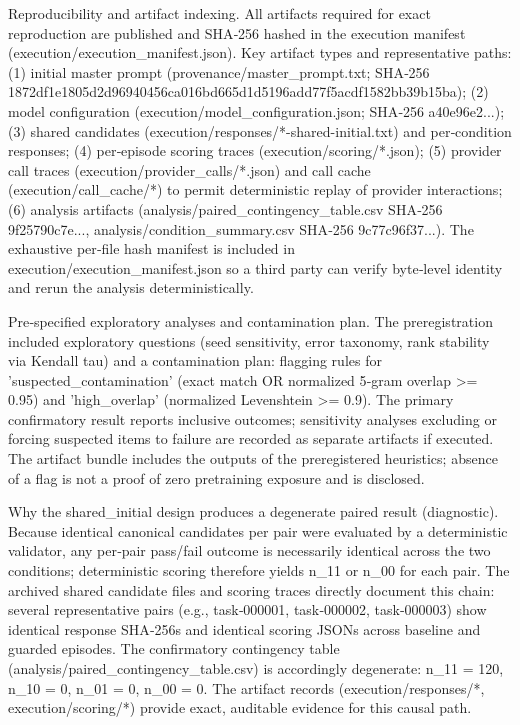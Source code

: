 \documentclass[conference]{IEEEtran}
\begin{document}
Reproducibility and artifact indexing. All artifacts required for exact reproduction are published and SHA‑256 hashed in the execution manifest (execution/execution\_manifest.json). Key artifact types and representative paths: (1) initial master prompt (provenance/master\_prompt.txt; SHA‑256 1872df1e1805d2d96940456ca016bd665d1d5196add77f5acdf1582bb39b15ba); (2) model configuration (execution/model\_configuration.json; SHA‑256 a40e96e2...); (3) shared candidates (execution/responses/*-shared-initial.txt) and per‑condition responses; (4) per‑episode scoring traces (execution/scoring/*.json); (5) provider call traces (execution/provider\_calls/*.json) and call cache (execution/call\_cache/*) to permit deterministic replay of provider interactions; (6) analysis artifacts (analysis/paired\_contingency\_table.csv SHA‑256 9f25790c7e..., analysis/condition\_summary.csv SHA‑256 9c77c96f37...). The exhaustive per‑file hash manifest is included in execution/execution\_manifest.json so a third party can verify byte‑level identity and rerun the analysis deterministically.

Pre‑specified exploratory analyses and contamination plan. The preregistration included exploratory questions (seed sensitivity, error taxonomy, rank stability via Kendall tau) and a contamination plan: flagging rules for 'suspected\_contamination' (exact match OR normalized 5‑gram overlap >= 0.95) and 'high\_overlap' (normalized Levenshtein >= 0.9). The primary confirmatory result reports inclusive outcomes; sensitivity analyses excluding or forcing suspected items to failure are recorded as separate artifacts if executed. The artifact bundle includes the outputs of the preregistered heuristics; absence of a flag is not a proof of zero pretraining exposure and is disclosed.

Why the shared\_initial design produces a degenerate paired result (diagnostic). Because identical canonical candidates per pair were evaluated by a deterministic validator, any per‑pair pass/fail outcome is necessarily identical across the two conditions; deterministic scoring therefore yields n\_11 or n\_00 for each pair. The archived shared candidate files and scoring traces directly document this chain: several representative pairs (e.g., task‑000001, task‑000002, task‑000003) show identical response SHA‑256s and identical scoring JSONs across baseline and guarded episodes. The confirmatory contingency table (analysis/paired\_contingency\_table.csv) is accordingly degenerate: n\_11 = 120, n\_10 = 0, n\_01 = 0, n\_00 = 0. The artifact records (execution/responses/*, execution/scoring/*) provide exact, auditable evidence for this causal path.
\end{document}
